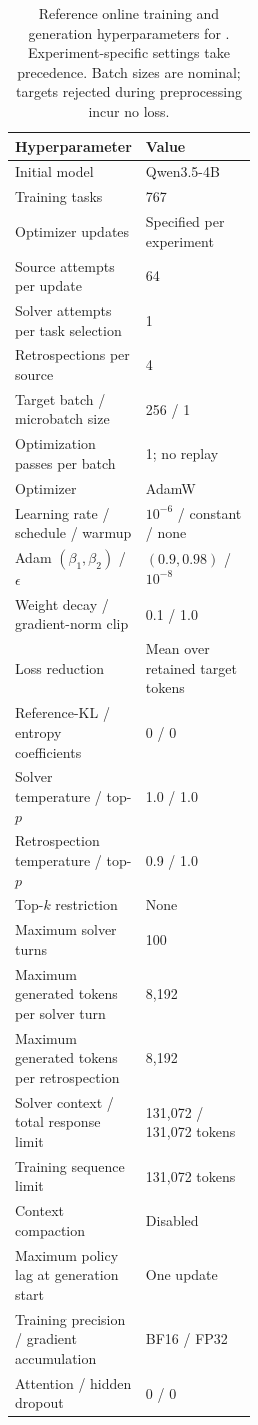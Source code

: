 \begin{table}[H]
\centering
\small
\caption{Reference online training and generation hyperparameters for
\methodabbr{}. Experiment-specific settings take precedence. Batch sizes
are nominal; targets rejected during preprocessing incur no loss.}
\label{tab:roft_hyperparameters}
\begin{tabularx}{\linewidth}{@{}p{0.48\linewidth}X@{}}
\toprule
Hyperparameter & Value \\
\midrule
Initial model & Qwen3.5-4B \\
Training tasks & 767 \\
Optimizer updates & Specified per experiment \\
Source attempts per update & 64 \\
Solver attempts per task selection & 1 \\
Retrospections per source & 4 \\
Target batch / microbatch size & 256 / 1 \\
Optimization passes per batch & 1; no replay \\
Optimizer & AdamW \\
Learning rate / schedule / warmup & $10^{-6}$ / constant / none \\
Adam $(\beta_1,\beta_2)$ / $\epsilon$ & $(0.9,0.98)$ / $10^{-8}$ \\
Weight decay / gradient-norm clip & 0.1 / 1.0 \\
Loss reduction & Mean over retained target tokens \\
Reference-KL / entropy coefficients & 0 / 0 \\
Solver temperature / top-$p$ & 1.0 / 1.0 \\
Retrospection temperature / top-$p$ & 0.9 / 1.0 \\
Top-$k$ restriction & None \\
Maximum solver turns & 100 \\
Maximum generated tokens per solver turn & 8,192 \\
Maximum generated tokens per retrospection & 8,192 \\
Solver context / total response limit & 131,072 / 131,072 tokens \\
Training sequence limit & 131,072 tokens \\
Context compaction & Disabled \\
Maximum policy lag at generation start & One update \\
Training precision / gradient accumulation & BF16 / FP32 \\
Attention / hidden dropout & 0 / 0 \\
\bottomrule
\end{tabularx}
\end{table}


